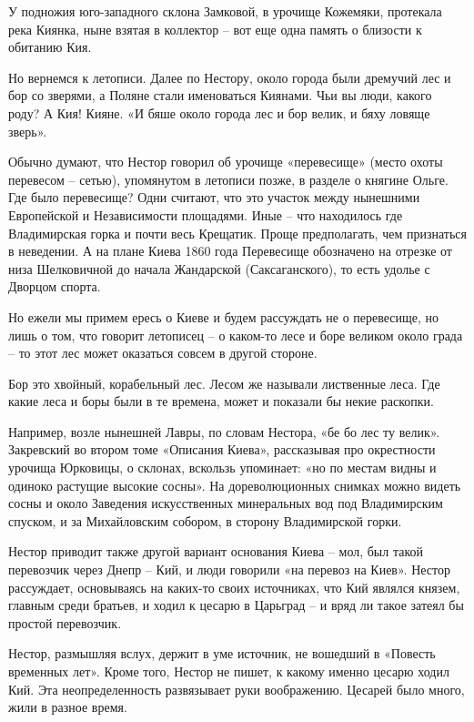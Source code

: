 У подножия юго-западного склона Замковой, в урочище Кожемяки, протекала река Киянка, ныне взятая в коллектор – вот еще одна память о близости к обитанию Кия.

Но вернемся к летописи. Далее по Нестору, около города были дремучий лес и бор со зверями, а Поляне стали именоваться Киянами. Чьи вы люди, какого роду? А Кия! Кияне. «И бяше около города лес и бор велик, и бяху ловяще зверь».

Обычно думают, что Нестор говорил об урочище «перевесище» (место охоты перевесом – сетью), упомянутом в летописи позже, в разделе о княгине Ольге. Где было перевесище? Одни считают, что это участок между нынешними Европейской и Независимости площадями. Иные – что находилось где Владимирская горка и почти весь Крещатик. Проще предполагать, чем признаться в неведении. А на плане Киева 1860 года Перевесище обозначено на отрезке от низа Шелковичной до начала Жандарской (Саксаганского), то есть удолье с Дворцом спорта.




Но ежели мы примем ересь о Киеве и будем рассуждать не о перевесище, но лишь о том, что говорит летописец – о каком-то лесе и боре великом около града – то этот лес может оказаться совсем в другой стороне.

Бор это хвойный, корабельный лес. Лесом же называли лиственные леса. Где какие леса и боры были в те времена, может и показали бы некие раскопки. 

Например, возле нынешней Лавры, по словам Нестора, «бе бо лес ту велик». Закревский во втором томе «Описания Киева»\cite{zakr01}, рассказывая про окрестности урочища Юрковицы, о склонах, вскользь упоминает: «но по местам видны и одиноко растущие высокие сосны». На дореволюционных снимках можно видеть сосны и около Заведения искусственных минеральных вод под Владимирским спуском, и за Михайловским собором, в сторону Владимирской горки.

Нестор приводит также другой вариант основания Киева – мол, был такой перевозчик через Днепр – Кий, и люди говорили  «на перевоз на Киев». Нестор рассуждает, основываясь на каких-то своих источниках, что Кий являлся князем, главным среди братьев, и ходил к цесарю в Царьград – и вряд ли такое затеял бы простой перевозчик. 

Нестор, размышляя вслух, держит в уме источник, не вошедший в «Повесть временных лет». Кроме того, Нестор не пишет, к какому именно цесарю ходил Кий. Эта неопределенность развязывает руки воображению. Цесарей было много, жили в разное время.

